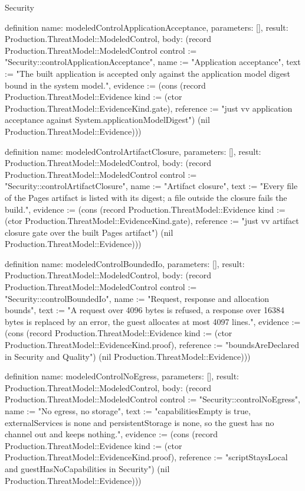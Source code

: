 \begin{lexlean}{Security}
\begin{semanticmodule}
definition{
  name: modeledControlApplicationAcceptance,
  parameters: [],
  result: Production.ThreatModel::ModeledControl,
  body: (record Production.ThreatModel::ModeledControl {control := "Security::controlApplicationAcceptance", name := "Application acceptance", text := "The built application is accepted only against the application model digest bound in the system model.", evidence := (cons (record Production.ThreatModel::Evidence {kind := (ctor Production.ThreatModel::EvidenceKind.gate), reference := "just vv application acceptance against System.applicationModelDigest"}) (nil Production.ThreatModel::Evidence))})
}

definition{
  name: modeledControlArtifactClosure,
  parameters: [],
  result: Production.ThreatModel::ModeledControl,
  body: (record Production.ThreatModel::ModeledControl {control := "Security::controlArtifactClosure", name := "Artifact closure", text := "Every file of the Pages artifact is listed with its digest; a file outside the closure fails the build.", evidence := (cons (record Production.ThreatModel::Evidence {kind := (ctor Production.ThreatModel::EvidenceKind.gate), reference := "just vv artifact closure gate over the built Pages artifact"}) (nil Production.ThreatModel::Evidence))})
}

definition{
  name: modeledControlBoundedIo,
  parameters: [],
  result: Production.ThreatModel::ModeledControl,
  body: (record Production.ThreatModel::ModeledControl {control := "Security::controlBoundedIo", name := "Request, response and allocation bounds", text := "A request over 4096 bytes is refused, a response over 16384 bytes is replaced by an error, the guest allocates at most 4097 lines.", evidence := (cons (record Production.ThreatModel::Evidence {kind := (ctor Production.ThreatModel::EvidenceKind.proof), reference := "boundsAreDeclared in Security and Quality"}) (nil Production.ThreatModel::Evidence))})
}

definition{
  name: modeledControlNoEgress,
  parameters: [],
  result: Production.ThreatModel::ModeledControl,
  body: (record Production.ThreatModel::ModeledControl {control := "Security::controlNoEgress", name := "No egress, no storage", text := "capabilitiesEmpty is true, externalServices is none and persistentStorage is none, so the guest has no channel out and keeps nothing.", evidence := (cons (record Production.ThreatModel::Evidence {kind := (ctor Production.ThreatModel::EvidenceKind.proof), reference := "scriptStaysLocal and guestHasNoCapabilities in Security"}) (nil Production.ThreatModel::Evidence))})
}


\end{semanticmodule}
\end{lexlean}
